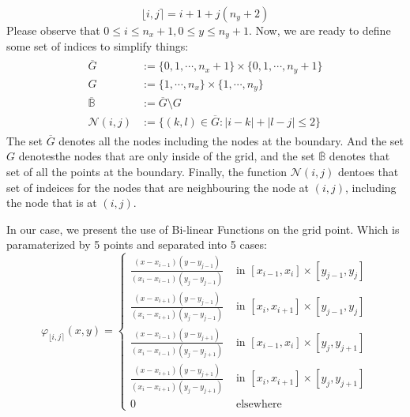 \documentclass[]{article}
\begin{document}
    $$
        \lfloor i, j\rceil = i + 1 + j(n_y + 2)
    $$
    Please observe that $0\le i \le n_x + 1, 0 \le y\le n_y +1$. Now, we are ready to define some set of indices to simplify things: 
    \begin{align*}\tag{3.3}\label{eqn:3.3}
        \begin{aligned}
                \overline{G} &:= \{0, 1, \cdots, n_x + 1\}\times \{0, 1, \cdots, n_y + 1\}
                \\
                G &:= \{1, \cdots, n_x\}\times \{1, \cdots, n_y\}
                \\
                \mathbb{\overline{B}}&:= \overline{G}\setminus G
                \\
                \mathcal{N}(i, j) &:= \{(k, l)\in \overline{G}: |i - k| + |l - j| \le 2\}
            \end{aligned}
    \end{align*}
    The set $\overline{G}$ denotes all the nodes including the nodes at the boundary. And the set $G$ denotesthe nodes that are only inside of the grid, and the set $\overline{\mathbb{B}}$ denotes that set of all the points at the boundary. Finally, the function $\mathcal{N}(i, j)$ dentoes that set of indeices for the nodes that are neighbouring the node at $(i, j)$, including the node that is at $(i, j)$. 
    \par
    In our case, we present the use of Bi-linear Functions on the grid point. Which is paramaterized by 5 points and separated into 5 cases: 
    \begin{equation*}\tag{3.4}\label{eqn:3.4}
        \varphi_{\lfloor i, j \rceil}(x, y)
        = \begin{cases}
            \frac{\left(x-x_{i-1}\right)\left(y-y_{j-1}\right)}{\left(x_{i}-x_{i-1}\right)\left(y_{j}-y_{j-1}\right)} & \text { in }\left[x_{i-1}, x_{i}\right] \times\left[y_{j-1}, y_{j}\right] 
            \\[0.5em]
            \frac{\left(x-x_{i+1}\right)\left(y-y_{j-1}\right)}{\left(x_{i}-x_{i+1}\right)\left(y_{j}-y_{j-1}\right)} & \text { in }\left[x_{i}, x_{i+1}\right] \times\left[y_{j-1}, y_{j}\right] 
            \\[0.5em]
            \frac{\left(x-x_{i-1}\right)\left(y-y_{j+1}\right)}{\left(x_{i}-x_{i-1}\right)\left(y_{j}-y_{j+1}\right)} & \text { in }\left[x_{i-1}, x_{i}\right] \times\left[y_{j}, y_{j+1}\right] 
            \\[0.5em]
            \frac{\left(x-x_{i+1}\right)\left(y-y_{j+1}\right)}{\left(x_{i}-x_{i+1}\right)\left(y_{j}-y_{j+1}\right)} & \text { in }\left[x_{i}, x_{i+1}\right] \times\left[y_{j}, y_{j+1}\right] 
            \\[0.5em]
            0 & \text { elsewhere }
        \end{cases}
    \end{equation*}
\end{document}
